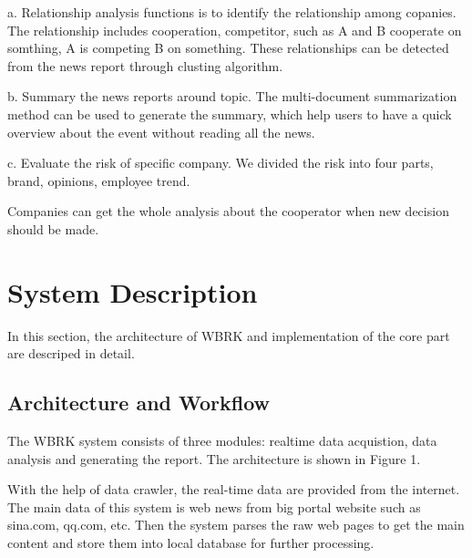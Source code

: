 \documentclass{acm_proc_article-sp}
\begin{document}
a. Relationship analysis functions is to identify the relationship among copanies.
The relationship includes cooperation, competitor, such as A and B cooperate on somthing, A is competing B on something.
These relationships can be detected from the news report through clusting algorithm.

b. Summary the news reports around topic. The multi-document summarization method can be used to generate the summary, which help users to have a quick overview about the event without reading all the news.

c. Evaluate the risk of specific company.
We divided the risk into four parts, brand, opinions, employee trend.

Companies can get the whole analysis about the cooperator when new decision should be made.

\section{System Description}

In this section, the architecture of WBRK and implementation of the core part are descriped in detail.

\subsection{Architecture and Workflow}

The WBRK system consists of three modules: realtime data acquistion, data analysis and generating the report.
The architecture is shown in Figure 1.

With the help of data crawler, the real-time data are provided from the internet. The main data of this system is web news from big portal website such as sina.com, qq.com, etc.
Then the system parses the raw web pages  to get the main content and store them into local database for further processing.




\end{document}
